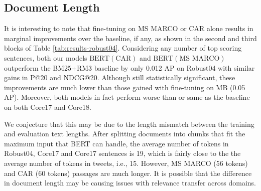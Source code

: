 \subsection{Document Length}

\begin{table}[b!]
\centering{}
\caption{Ranking effectiveness on Robust04 with the shortened MS MARCO and CAR models indicated with $\star$.}
\label{tab:results-chopped}
\end{table}

It is interesting to note that fine-tuning on MS MARCO or CAR alone results in marginal improvements over the baseline, if any, as shown in the second and third blocks of Table \ref{tab:results-robust04}.
Considering any number of top scoring sentences, both our models $ \textrm{BERT}(\textrm{CAR}) $ and $ \textrm{BERT}(\textrm{MS MARCO}) $ outperform the BM25+RM3 baseline by only 0.012 AP on Robust04 with similar gains in P@20 and NDCG@20.
Although still statistically significant, these improvements are much lower than those gained with fine-tuning on MB (0.05 AP).
Moreover, both models in fact perform worse than or same as the baseline on both Core17 and Core18.

We conjecture that this may be due to the length mismatch between the training and evaluation text lengths.
After splitting documents into chunks that fit the maximum input that BERT can handle, the average number of tokens in Robust04, Core17 and Core17 sentences is 19, which is fairly close to the the average number of tokens in tweets, i.e., 15.
However, MS MARCO (56 tokens) and CAR (60 tokens) passages are much longer.
It is possible that the difference in document length may be causing issues with relevance transfer across domains.

